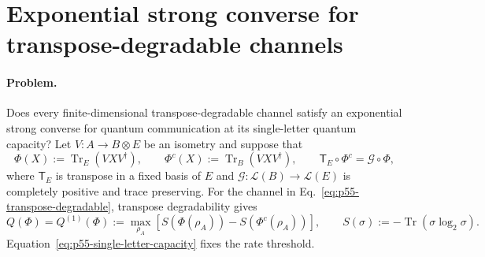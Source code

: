 \section{Exponential strong converse for transpose-degradable channels}
\label{sec:op_414fbcc7d5dc0c64}

\paragraph{Problem.}
Does every finite-dimensional transpose-degradable channel satisfy an
exponential strong converse for quantum communication at its single-letter
quantum capacity?  Let $V:A\to B\otimes E$ be an isometry and suppose that
\begin{equation}
  \Phi(X):=\operatorname{Tr}_E(VXV^\dagger),
  \qquad
  \Phi^c(X):=\operatorname{Tr}_B(VXV^\dagger),
  \qquad
  \mathsf T_E\circ\Phi^c=\mathcal G\circ\Phi,
  \label{eq:p55-transpose-degradable}
\end{equation}
where $\mathsf T_E$ is transpose in a fixed basis of $E$ and
$\mathcal G:\mathcal L(B)\to\mathcal L(E)$ is completely positive and
trace preserving.  For the channel in
Eq.~\eqref{eq:p55-transpose-degradable}, transpose degradability gives
\begin{equation}
  Q(\Phi)=Q^{(1)}(\Phi)
  :=\max_{\rho_A}
     \left[S(\Phi(\rho_A))-S(\Phi^c(\rho_A))\right],
  \qquad
  S(\sigma):=-\operatorname{Tr}(\sigma\log_2\sigma).
  \label{eq:p55-single-letter-capacity}
\end{equation}
Equation~\eqref{eq:p55-single-letter-capacity} fixes the rate threshold.

